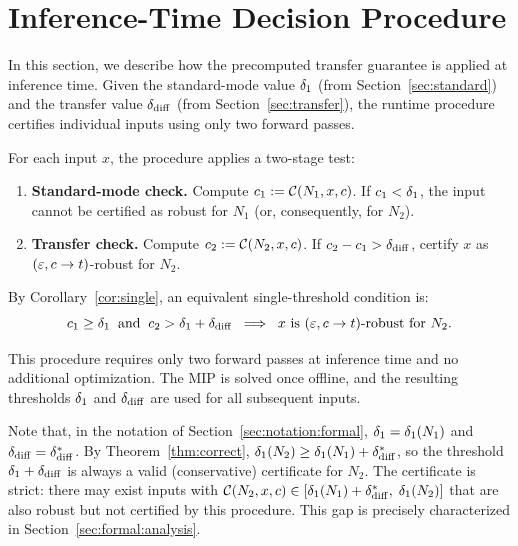 \section{Inference-Time Decision Procedure}
\label{sec:inference}

In this section, we describe how the precomputed transfer guarantee is applied at inference time. Given the standard-mode value $\delta_1$ (from Section~\ref{sec:standard}) and the transfer value $\delta_{\mathrm{diff}}$ (from Section~\ref{sec:transfer}), the runtime procedure certifies individual inputs using only two forward passes.

For each input $x$, the procedure applies a two-stage test:
\begin{enumerate}
  \item \textbf{Standard-mode check.}
    Compute $c_1 := \mathcal{C}(N_1,x,c)$.
    If $c_1 < \delta_1$, the input cannot be certified as robust for $N_1$ (or, consequently, for $N_2$).

  \item \textbf{Transfer check.}
    Compute $c_2 := \mathcal{C}(N_2,x,c)$.
    If $c_2 - c_1 > \delta_{\mathrm{diff}}$, certify $x$ as $(\varepsilon,c\to t)$-robust for $N_2$.
\end{enumerate}

By Corollary~\ref{cor:single}, an equivalent single-threshold condition is:
\[
  c_1 \ge \delta_1 \;\;\text{and}\;\; c_2 > \delta_1 + \delta_{\mathrm{diff}}
  \;\;\Longrightarrow\;\;
  x \text{ is } (\varepsilon, c \to t)\text{-robust for } N_2.
\]

This procedure requires only two forward passes at inference time and no additional optimization. The MIP is solved once offline, and the resulting thresholds $\delta_1$ and $\delta_{\mathrm{diff}}$ are used for all subsequent inputs.

Note that, in the notation of Section~\ref{sec:notation:formal}, $\delta_1 = \delta_1(N_{1})$ and $\delta_{\mathrm{diff}} = \delta_{\mathrm{diff}}^{*}$. By Theorem~\ref{thm:correct}, $\delta_1(N_{2}) \geq \delta_1(N_{1}) + \delta_{\mathrm{diff}}^{*}$, so the threshold $\delta_1 + \delta_{\mathrm{diff}}$ is always a valid (conservative) certificate for $N_2$. The certificate is strict: there may exist inputs with $\mathcal{C}(N_2,x,c) \in [\delta_1(N_{1})+\delta_{\mathrm{diff}}^{*},\; \delta_1(N_{2})]$ that are also robust but not certified by this procedure. This gap is precisely characterized in Section~\ref{sec:formal:analysis}.
